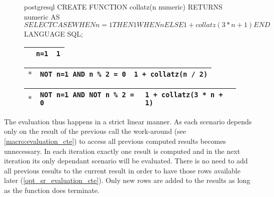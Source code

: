 \begin{figure}[h]
    \centering
    \begin{minipage}[b]{\linewidth}
    \centering
    \begin{cminted}{postgresql}
CREATE FUNCTION collatz(n numeric) RETURNS numeric AS $$
  SELECT CASE
    WHEN n = 1     THEN 1
    WHEN n %
    ELSE 1 + collatz(3*n+1)
  END
$$ LANGUAGE SQL;
    \end{cminted}
    \label{lst:collatz_udf}
    \end{minipage}\par
    \vspace*{8mm}
    \begin{minipage}[b]{\linewidth}
    \centering\footnotesize
        \begin{tabular}{|p{1em}|p{5.5cm}|p{4.5cm}|}\hline
        \cellcolor{gray!25} & \texttt{\phantom{NOT }n=1} & \texttt{1}\\\hline
        \end{tabular}
        
        \begin{tabular}{|p{1em}|p{5.5cm}|p{4.5cm}|}\hline
        \cellcolor{gray!25} $\ast$ & \texttt{NOT n=1 AND \phantom{NOT }n \% 2 = 0} & \texttt{1 + collatz(n / 2)}\\\hline
        \end{tabular}
        
        \begin{tabular}{|p{1em}|p{5.5cm}|p{4.5cm}|}\hline
        \cellcolor{gray!25} $\ast$ & \texttt{NOT n=1 AND NOT n \% 2 = 0} & \texttt{1 + collatz(3 * n + 1)}\\\hline
        \end{tabular}
    \label{collatz_scenarios}
    \end{minipage}
    \caption{}
    \label{collatz_sql_with_scenarios}
\end{figure}

The evaluation thus happens in a strict linear manner. As each scenario depends only on the result of the previous call the work-around (see \autoref{macro:evaluation_cte}) to access all previous computed results becomes unnecessary. In each iteration exactly one result is computed and in the next iteration its only dependant scenario will be evaluated. There is no need to add all previous results to the current result in order to have those rows available later (\autoref{opt_sr_evaluation_cte}). Only new rows are added to the results as long as the function does terminate.

